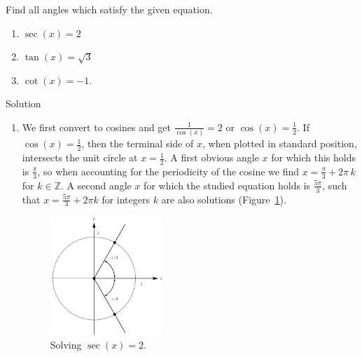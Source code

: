 \ifvc
\begin{example}  \label{solveforangle2}  

Find all angles which satisfy the given equation.   

\begin{multicols}{3}

\begin{enumerate}

\item  $\sec(x) =2$

\item  $\tan(x) = \sqrt{3}$

\item  \label{cotangentisnegativeone} $\cot(x) = -1$.

\end{enumerate}

\end{multicols}


Solution 

\begin{enumerate}

\item  We first convert to cosines and get $\frac{1}{\cos(x)} = 2$ or $\cos(x) = \frac{1}{2}$. If $\cos(x) = \frac{1}{2}$, then the terminal side of $x$, when plotted in standard position, intersects the unit circle at $x=\frac{1}{2}$. A first obvious angle $x$ for which this holds is $\frac{\pi}{3}$, so when accounting for the periodicity of the cosine we find $x=\frac{\pi}{3}+2\pi\,k$ for $k\in\mathbb{Z}$. A second angle $x$ for which the studied equation holds is $\frac{5\pi}{3}$, such that  $x = \frac{5\pi}{3} + 2\pi k$ for integers $k$ are also solutions (Figure~\ref{fig_trans_16}).


\begin{figure}[H]
	\begin{center}
			\includegraphics[width=0.4\textwidth]{fig_trans_16}
	\caption{Solving $\sec(x)=2$. }
	\label{fig_trans_16}
	\end{center}
\end{figure}



\end{enumerate}
\end{example}
